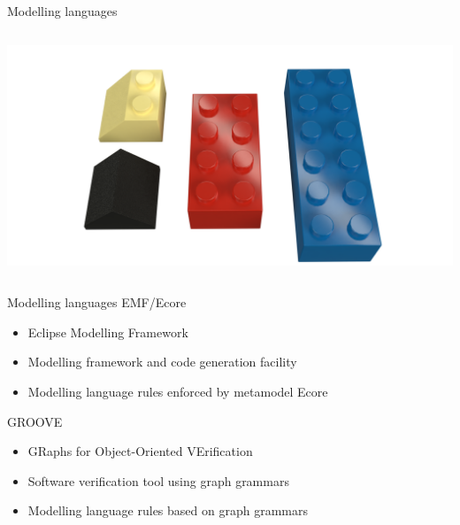 \begin{frame}{Modelling languages}
\begin{columns}[c]
\begin{column}{0.4\textwidth}
        \includegraphics[width=\textwidth]{images/02_modelling_languages/lego_brick_examples.png}
    \end{column}
\end{columns}
\end{frame}


\begin{frame}{Modelling languages}
    EMF/Ecore
    \begin{itemize}
        \item Eclipse Modelling Framework
        \item Modelling framework and code generation facility
        \item Modelling language rules enforced by metamodel Ecore
    \end{itemize}
    \pause
    GROOVE
    \begin{itemize}
        \item GRaphs for Object-Oriented VErification
        \item Software verification tool using graph grammars
        \item Modelling language rules based on graph grammars
    \end{itemize}
\end{frame}


